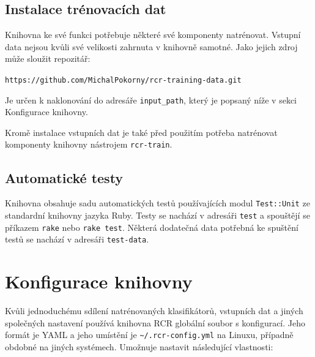 \documentclass[a4paper]{article}
\begin{document}
\subsection{Instalace trénovacích dat}
Knihovna ke své funkci potřebuje některé své komponenty natrénovat.
Vstupní data nejsou kvůli své velikosti zahrnuta v knihovně samotné.
Jako jejich zdroj může sloužit repozitář:
\begin{center}
	\texttt{https://github.com/MichalPokorny/rcr-training-data.git}
\end{center}
Je určen k naklonování do adresáře \texttt{input\_path}, který je popsaný
níže v sekci Konfigurace knihovny.

Kromě instalace vstupních dat je také před použitím potřeba natrénovat
komponenty knihovny nástrojem \texttt{rcr-train}.

\subsection{Automatické testy}
Knihovna obsahuje sadu automatických testů používajících modul
\texttt{Test::Unit} ze standardní knihovny jazyka Ruby.
Testy se nachází v adresáři \texttt{test} a spouštějí se příkazem
\texttt{rake} nebo \texttt{rake test}. Některá dodatečná data potřebná
ke spuštění testů se nachází v adresáři \texttt{test-data}.

\section{Konfigurace knihovny}
Kvůli jednoduchému sdílení natrénovaných klasifikátorů, vstupních dat
a jiných společných nastavení používá knihovna RCR globální soubor
s konfigurací. Jeho formát je YAML a jeho umístění je
\texttt{\textasciitilde/.rcr-config.yml}
na Linuxu, případně obdobné na jiných systémech.
Umožnuje nastavit následující vlastnosti:
\end{document}

